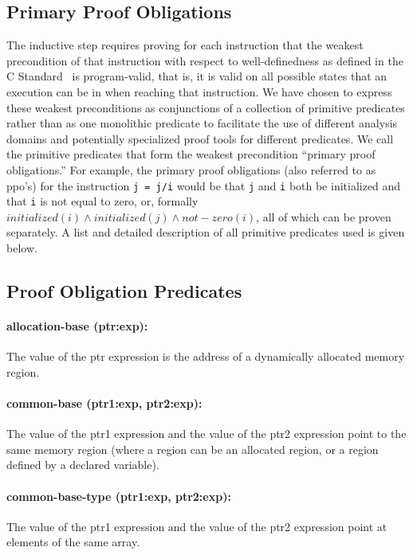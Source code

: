 \documentclass[11pt]{article}
\begin{document}
\subsection{Primary Proof Obligations}

The inductive step requires proving for each instruction that the weakest
precondition of that instruction with respect to well-definedness as
defined in the C Standard~\cite{cstandard} is program-valid, that is,
it is valid on all possible states that an execution can be in when
reaching that instruction. We have chosen to express these weakest
preconditions as conjunctions of a collection of primitive predicates rather than as one
monolithic predicate to facilitate the use of different analysis domains
and potentially specialized proof tools for different predicates.
We call the primitive predicates that form the weakest precondition
``primary proof obligations.'' For example, the primary proof obligations
(also referred to as ppo's) for 
the instruction {\tt j = j/i} would be that {\tt j} and
{\tt i} both be initialized and that {\tt i} is not equal to zero,
or, formally $initialized(i) \wedge initialized(j) \wedge not-zero(i)$,
all of which can be proven separately. A list and detailed description
of all primitive predicates used is given below.

\subsection{Proof Obligation Predicates}

\paragraph{allocation-base (ptr:exp): }
The value of the ptr expression is the address of a 
                dynamically allocated memory region.

\paragraph{common-base (ptr1:exp, ptr2:exp): }
The value of the ptr1 expression and the value of the ptr2 expression
   point to the same memory region (where a region can be an allocated region, or a region
   defined by a declared variable).
   
\paragraph{common-base-type (ptr1:exp, ptr2:exp): }
The value of the ptr1 expression and the value of the ptr2 expression
  point at elements of the same array.
\end{document}
